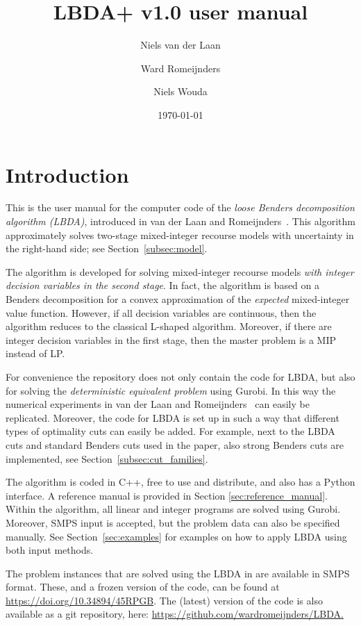 \documentclass[12pt, english]{article}
\title{LBDA+ v1.0 user manual}
\author{
	Niels van der Laan
	\and
	Ward Romeijnders
	\and
	Niels Wouda
}
\date{\today}
\begin{document}
	
\maketitle
\tableofcontents

\clearpage

\section{Introduction}
\label{sec:introduction}
This is the user manual for the computer code of the \emph{loose Benders decomposition algorithm (LBDA)}, introduced in van der Laan and Romeijnders~\cite{vanderLaan2020}. This algorithm approximately solves two-stage mixed-integer recourse models with uncertainty in the right-hand side; see Section~\ref{subsec:model}. 

The algorithm is developed for solving mixed-integer recourse models \emph{with integer decision variables in the second stage}. In fact, the algorithm is based on a Benders decomposition for a convex approximation of the \emph{expected} mixed-integer value function. However, if all decision variables are continuous, then the algorithm reduces to the classical L-shaped algorithm. Moreover, if there are integer decision variables in the first stage, then the master problem is a MIP instead of LP.

For convenience the repository does not only contain the code for LBDA, but also for solving the \emph{deterministic equivalent problem} using Gurobi. In this way the numerical experiments in van der Laan and Romeijnders~\cite{vanderLaan2020} can easily be replicated. Moreover, the code for LBDA is set up in such a way that different types of optimality cuts can easily be added. For example, next to the LBDA cuts and standard Benders cuts used in the paper, also strong Benders cuts are implemented, see Section~\ref{subsec:cut_families}.

The algorithm is coded in C++, free to use and distribute, and also has a Python interface. A reference manual is provided in Section \ref{sec:reference_manual}. Within the algorithm, all linear and integer programs are solved using Gurobi. Moreover, SMPS input is accepted, but the problem data can also be specified manually. See Section~\ref{sec:examples} for examples on how to apply LBDA using both input methods. 

The problem instances that are solved using the LBDA in \cite{vanderLaan2020} are available in SMPS format. These, and a frozen version of the code, can be found at \url{https://doi.org/10.34894/45RPGB}. The (latest) version of the code is also available as a git repository, here: \url{https://github.com/wardromeijnders/LBDA.}
\end{document}
